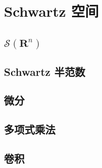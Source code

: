 \section{Schwartz 空间}
\label{b2:sec:0501}


\subsection{\texorpdfstring{\(\mathcal S(\mathbf R^n)\)}{()}}
\label{b2:subsec:050101}

\subsection{Schwartz 半范数}
\label{b2:subsec:050102}

\subsection{微分}
\label{b2:subsec:050103}

\subsection{多项式乘法}
\label{b2:subsec:050104}

\subsection{卷积}
\label{b2:subsec:050105}


